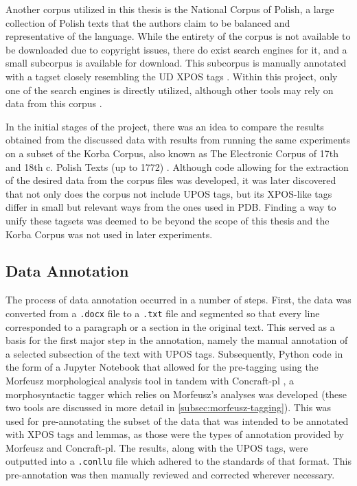 Another corpus utilized in this thesis is the National Corpus of Polish, a large collection of Polish texts that the authors claim to be balanced and representative of the language. While the entirety of the corpus is not available to be downloaded due to copyright issues, there do exist search engines for it, and a small subcorpus is available for download. This subcorpus is manually annotated with a tagset closely resembling the UD XPOS tags \citep{nkjp}. Within this project, only one of the search engines is directly utilized, although other tools may rely on data from this corpus \citep{pęzik_2012}.

In the initial stages of the project, there was an idea to compare the results obtained from the discussed data with results from running the same experiments on a subset of the Korba Corpus, also known as The Electronic Corpus of 17th and 18th c. Polish Texts (up to 1772) \citep{korba}. Although code allowing for the extraction of the desired data from the corpus files was developed, it was later discovered that not only does the corpus not include UPOS tags, but its XPOS-like tags differ in small but relevant ways from the ones used in PDB. Finding a way to unify these tagsets was deemed to be beyond the scope of this thesis and the Korba Corpus was not used in later experiments. 

\subsection{Data Annotation}
\label{subsec:annotation}

The process of data annotation occurred in a number of steps. First, the data was converted from a \texttt{.docx} file to a \texttt{.txt} file and segmented so that every line corresponded to a paragraph or a section in the original text. This served as a basis for the first major step in the annotation, namely the manual annotation of a selected subsection of the text with UPOS tags. Subsequently, Python code in the form of a Jupyter Notebook that allowed for the pre-tagging using the Morfeusz morphological analysis tool \citep{kie:wol:17:morf} in tandem with Concraft-pl \citep{waszczuk-2012-harnessing, waszczuk2018morphosyntactic}, a morphosyntactic tagger which relies on Morfeusz's analyses was developed (these two tools are discussed in more detail in \autoref{subsec:morfeusz-tagging}). This was used for pre-annotating the subset of the data that was intended to be annotated with XPOS tags and lemmas, as those were the types of annotation provided by Morfeusz and Concraft-pl. The results, along with the UPOS tags, were outputted into a \texttt{.conllu} file which adhered to the standards of that format. This pre-annotation was then manually reviewed and corrected wherever necessary.

